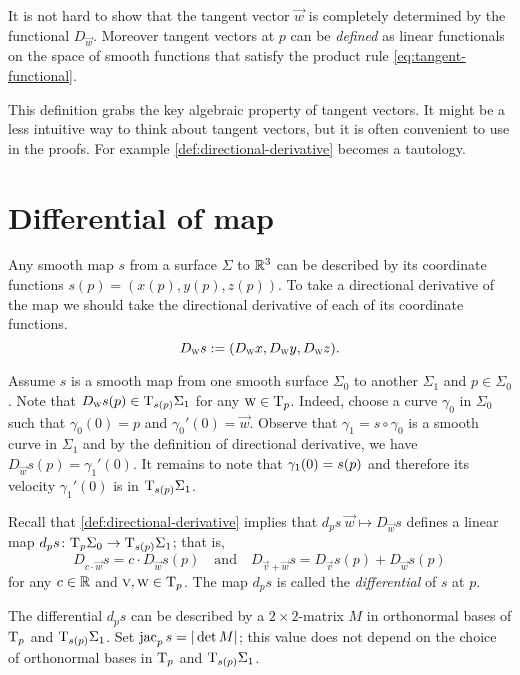 It is not hard to show that the tangent vector $\vec w$ is completely determined by the functional $D_{\vec w}$.
Moreover tangent vectors at $p$ can be \emph{defined} as linear functionals on the space of smooth functions
that satisfy the product rule \ref{eq:tangent-functional}.

This definition grabs the key algebraic property of tangent vectors.
It might be a less intuitive way to think about tangent vectors, but it is often convenient to use in the proofs. 
For example \ref{def:directional-derivative} becomes a tautology.

\section{Differential of map}

Any smooth map $s$ from a surface $\Sigma$ to $\mathbb{R}^3$ can be described by its coordinate functions 
$ s(p)=(x(p),y(p),z(p))$. 
To take a directional derivative of the map we should take the  directional derivative of each of its coordinate functions.
\[D_{\text{\sc{w}}} s\mathrel{:=}(D_{\text{\sc{w}}}x,D_{\text{\sc{w}}}y,D_{\text{\sc{w}}}z).\]

Assume $ s$ is a smooth map from one smooth surface $\Sigma_0$ to another $\Sigma_1$ and $p\in \Sigma_0$.
Note that $D_{\text{\sc{w}}} s(p)\in \mathrm{T}_{s(p)}\Sigma_1$ for any $\text{\sc{w}}\in \mathrm{T}_p$.
Indeed, choose a curve $\gamma_0$ in $\Sigma_0$ such that $\gamma_0(0)=p$ and $\gamma_0'(0)=\vec w$.
Observe that $\gamma_1= s\circ \gamma_0$ is a smooth curve in $\Sigma_1$ and 
by the definition of directional derivative, we have $D_{\vec w} s(p)=\gamma_1'(0)$.
It remains to note that $\gamma_1(0)\z= s(p)$ and therefore its velocity $\gamma_1'(0)$ is in $\mathrm{T}_{ s(p)}\Sigma_1$.

Recall that \ref{def:directional-derivative} implies that 
$d_p s\:\vec w \mapsto D_{\vec w} s$ defines a linear map $d_p s\colon\mathrm{T}_p\Sigma_0\to \mathrm{T}_{ s(p)}\Sigma_1$;
that is,
\[D_{c\cdot \vec w} s=c\cdot D_{\vec w} s(p)
\quad\text{and}\quad D_{\vec v+ \vec w} s=D_{\vec v} s(p)+ D_{\vec w} s(p)\]
for any $c\in\mathbb{R}$ and $\text{\sc{v}}, \text{\sc{w}}\in\mathrm{T}_p$.
The map $d_p s$ is called the \emph{differential} of $s$ at $p$.

The differential $d_p s$ can be described by a $2{\times}2$-matrix $M$ in orthonormal bases of $\mathrm{T}_p$ and $\mathrm{T}_{ s(p)}\Sigma_1$.
Set $\mathop{\rm jac}\nolimits_p s=|\det M|$; this value  
does not depend on the choice of orthonormal bases in $\mathrm{T}_p$ and $\mathrm{T}_{ s(p)}\Sigma_1$. \label{page:|L|}

